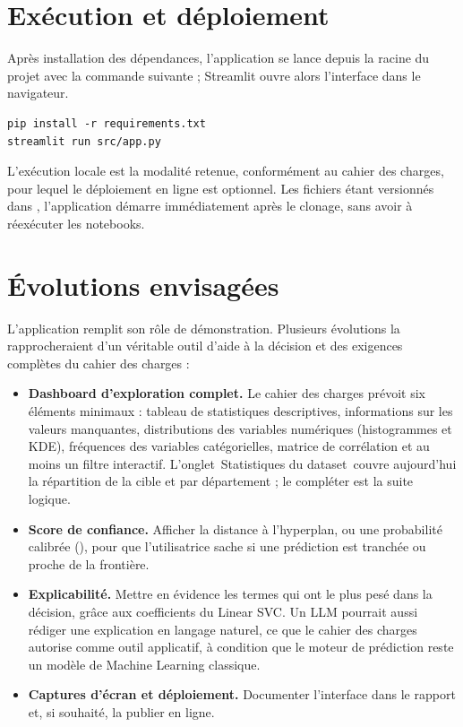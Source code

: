 \documentclass[11pt,a4paper]{report}
\makeatletter
\def\og{\guillemotleft\nobreak\,}%
\def\fg{\unskip\nobreak\,\guillemotright}%
\newcommand{\gl}[1]{\og #1\fg{}}       %
\numberwithin{equation}{chapter}
\DeclareRobustCommand{\code}[1]{{\ttfamily\fontsize{\strip@pt\dimexpr\f@size pt*9/10\relax}{\f@baselineskip}\selectfont\detokenize{#1}}}
\makeatother
\begin{document}
\section{Exécution et déploiement}
Après installation des dépendances, l'application se lance depuis la racine du projet avec la commande suivante ; Streamlit ouvre alors l'interface dans le navigateur.
\begin{codebox}
\begin{Verbatim}[fontsize=\small]
pip install -r requirements.txt
streamlit run src/app.py
\end{Verbatim}
\end{codebox}
L'exécution locale est la modalité retenue, conformément au cahier des charges, pour lequel le déploiement en ligne est optionnel. Les fichiers \code{.pkl} étant versionnés dans \code{models/}, l'application démarre immédiatement après le clonage, sans avoir à réexécuter les notebooks.

\section{Évolutions envisagées}
L'application remplit son rôle de démonstration. Plusieurs évolutions la rapprocheraient d'un véritable outil d'aide à la décision et des exigences complètes du cahier des charges :
\begin{itemize}
\item \textbf{Dashboard d'exploration complet.} Le cahier des charges prévoit six éléments minimaux : tableau de statistiques descriptives, informations sur les valeurs manquantes, distributions des variables numériques (histogrammes et KDE), fréquences des variables catégorielles, matrice de corrélation et au moins un filtre interactif. L'onglet \gl{Statistiques du dataset} couvre aujourd'hui la répartition de la cible et par département ; le compléter est la suite logique.
\item \textbf{Score de confiance.} Afficher la distance à l'hyperplan, ou une probabilité calibrée (\code{CalibratedClassifierCV}), pour que l'utilisatrice sache si une prédiction est tranchée ou proche de la frontière.
\item \textbf{Explicabilité.} Mettre en évidence les termes qui ont le plus pesé dans la décision, grâce aux coefficients du Linear SVC. Un LLM pourrait aussi rédiger une explication en langage naturel, ce que le cahier des charges autorise comme outil applicatif, à condition que le moteur de prédiction reste un modèle de Machine Learning classique.
\item \textbf{Captures d'écran et déploiement.} Documenter l'interface dans le rapport et, si souhaité, la publier en ligne.
\end{itemize}
\end{document}
